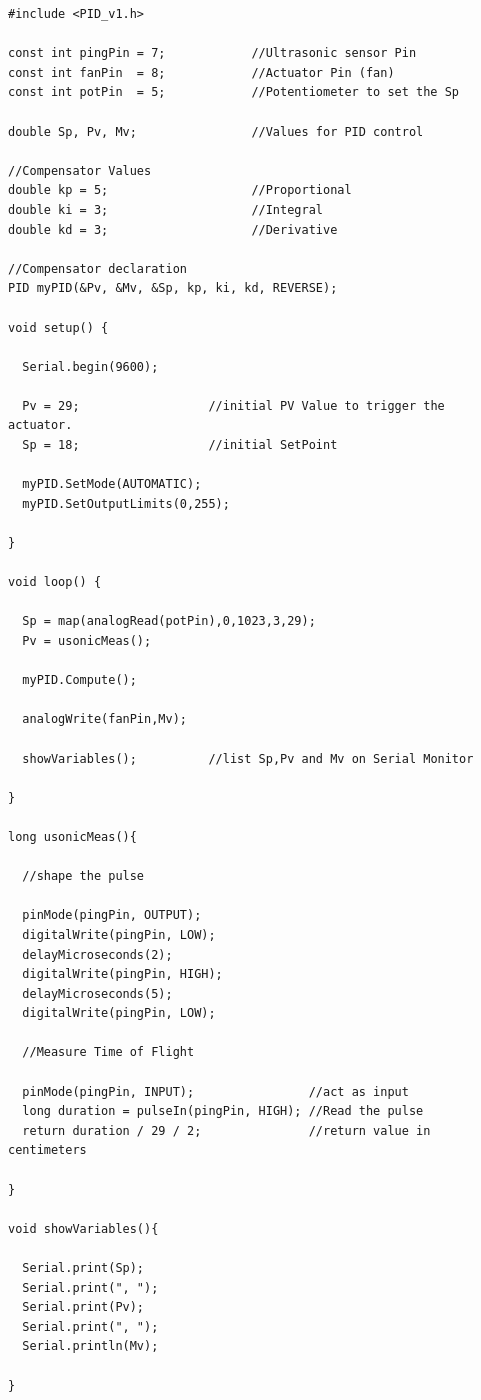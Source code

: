 \documentclass[letterpaper, 10pt]{report}
\begin{document}
 \begin{lstlisting}[style=myArduino]
 #include <PID_v1.h>

const int pingPin = 7;            //Ultrasonic sensor Pin
const int fanPin  = 8;            //Actuator Pin (fan)
const int potPin  = 5;            //Potentiometer to set the Sp

double Sp, Pv, Mv;                //Values for PID control

//Compensator Values
double kp = 5;                    //Proportional
double ki = 3;                    //Integral
double kd = 3;                    //Derivative

//Compensator declaration
PID myPID(&Pv, &Mv, &Sp, kp, ki, kd, REVERSE);

void setup() {
  
  Serial.begin(9600);
  
  Pv = 29;                  //initial PV Value to trigger the actuator.
  Sp = 18;                  //initial SetPoint
  
  myPID.SetMode(AUTOMATIC);
  myPID.SetOutputLimits(0,255);

}

void loop() {
  
  Sp = map(analogRead(potPin),0,1023,3,29);
  Pv = usonicMeas();
  
  myPID.Compute();
  
  analogWrite(fanPin,Mv);

  showVariables();          //list Sp,Pv and Mv on Serial Monitor
  
}

long usonicMeas(){

  //shape the pulse
  
  pinMode(pingPin, OUTPUT);
  digitalWrite(pingPin, LOW);             
  delayMicroseconds(2);         
  digitalWrite(pingPin, HIGH);  
  delayMicroseconds(5);
  digitalWrite(pingPin, LOW);

  //Measure Time of Flight
  
  pinMode(pingPin, INPUT);                //act as input
  long duration = pulseIn(pingPin, HIGH); //Read the pulse
  return duration / 29 / 2;               //return value in centimeters
  
}

void showVariables(){
  
  Serial.print(Sp);
  Serial.print(", ");
  Serial.print(Pv);
  Serial.print(", ");
  Serial.println(Mv);  

}
 
 \end{lstlisting}
\end{document}
